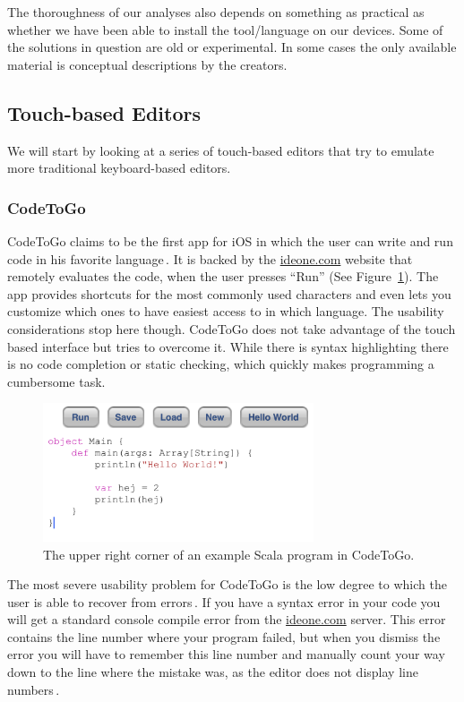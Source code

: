 The thoroughness of our analyses also depends on something as practical as whether we have been able to install the tool/language on our devices.
Some of the solutions in question are old or experimental.
In some cases the only available material is conceptual descriptions by the creators.

\subsection{Touch-based Editors}
\label{subsec:TouchBasedEditors}
We will start by looking at a series of touch-based editors that try to emulate more traditional keyboard-based editors. 

\subsubsection{CodeToGo}
\label{subsub:CodeToGo}
CodeToGo claims to be the first app for iOS in which the user can write and run code in his favorite language\,\cite{codetogo}. It is backed by the \url{ideone.com} website\cite{ideone} that remotely evaluates the code, when the user presses ``Run'' (See Figure~\ref{fig:CodeToGo_screenshot}). The app provides shortcuts for the most commonly used characters and even lets you customize which ones to have easiest access to in which language. The usability considerations stop here though. CodeToGo does not take advantage of the touch based interface but tries to overcome it. While there is syntax highlighting there is no code completion or static checking, which quickly makes programming a cumbersome task.

\begin{figure}
	\centering
		\includegraphics[width=80mm]{diagrams/CodeToGo_screenshot.PNG}
	\caption{The upper right corner of an example Scala program in CodeToGo.}
\label{fig:CodeToGo_screenshot}
\end{figure}

The most severe usability problem for CodeToGo is the low degree to which the user is able to recover from errors\,\cite{nielsen1990heuristic}. 
If you have a syntax error in your code you will get a standard console compile error from the \url{ideone.com} server. 
This error contains the line number where your program failed, but when you dismiss the error you will have to remember this line number and manually count your way down to the line where the mistake was, as the editor does not display line numbers\,\cite{nielsen1990heuristic}.

